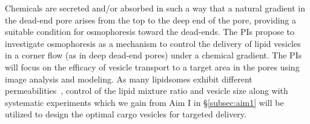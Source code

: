\documentclass[11pt]{article}
\begin{document}
Chemicals are secreted and/or absorbed in such a way that a natural
gradient in the dead-end pore arises from the top to the deep end of the
pore, providing a suitable condition for osmophoresis toward the
dead-ends.  The PIs propose to investigate osmophoresis as a mechanism
to control the delivery of lipid vesicles in a corner flow (as in deep
dead-end pores) under a chemical gradient.  The PIs will focus on the
efficacy of vesicle transport to a target area in the pores using image
analysis and modeling.  As many lipidsomes exhibit different
permeabilities~\cite{fettiplace1980,olbrich2000}, control of the lipid
mixture ratio and vesicle size along with systematic experiments which
we gain from Aim I in \S\ref{subsec:aim1} will be utilized to design the
optimal cargo vesicles for targeted delivery. 

\vspace*{-7pt}
\end{document}

